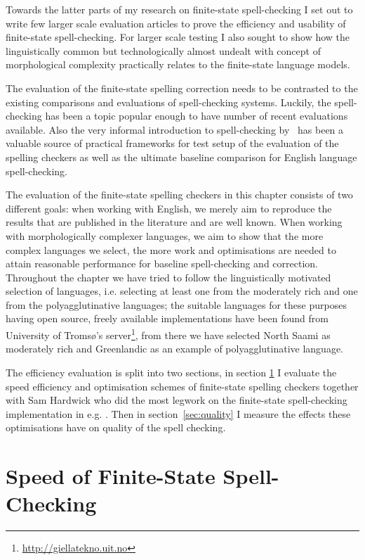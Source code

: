 \documentclass[officiallayout]{unihelcompling}
\begin{document}
Towards the latter parts of my research on finite-state spell-checking I set
out to write few larger scale evaluation articles to prove the efficiency and
usability of finite-state spell-checking. For larger scale testing I also
sought to show how the linguistically common but technologically almost undealt
with concept of morphological complexity practically relates to the
finite-state language models.

The evaluation of the finite-state spelling correction needs to be contrasted
to the existing comparisons and evaluations of spell-checking systems. Luckily,
the spell-checking has been a topic popular enough to have number of recent
evaluations available.  Also the very informal introduction to spell-checking
by~\citep{norvig2010howto} has been a valuable source of practical frameworks
for test setup of the evaluation of the spelling checkers as well as the
ultimate baseline comparison for English language spell-checking.

The evaluation of the finite-state spelling checkers in this chapter consists
of two different goals: when working with English, we merely aim to reproduce
the results that are published in the literature and are well known. When
working with morphologically complexer languages, we aim to show that the more
complex languages we select, the more work and optimisations are needed to
attain reasonable performance for baseline spell-checking and correction.
Throughout the chapter we have tried to follow the linguistically motivated
selection of languages, i.e. selecting at least one from the moderately rich
and one from the polyagglutinative languages; the suitable languages for these
purposes having open source, freely available implementations have been found
from University of Tromsø's server\footnote{\url{http://giellatekno.uit.no}},
from there we have selected North Saami as moderately rich and Greenlandic as
an example of polyagglutinative language.

The efficiency evaluation is split into two sections, in section
\ref{sec:speed} I evaluate the speed efficiency and optimisation schemes of
finite-state spelling checkers together with Sam Hardwick who did the
most legwork on the finite-state spell-checking implementation in e.g.
\citep{linden2011hfst}. Then in section~\ref{sec:quality} I measure the
effects these optimisations have on quality of the spell checking.

\section{Speed of Finite-State Spell-Checking}
\label{sec:speed}
\end{document}
